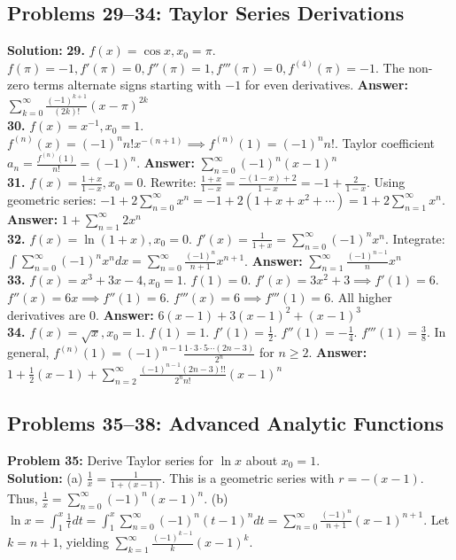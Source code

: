 \documentclass[11pt, letterpaper]{article}
\theoremstyle{definition}
\theoremstyle{remark}
\begin{document}
\subsection{Problems 29--34: Taylor Series Derivations}
\textbf{Solution:}
\textbf{29.} $f(x) = \cos x, x_0 = \pi$.
$f(\pi) = -1, f'(\pi) = 0, f''(\pi) = 1, f'''(\pi) = 0, f^{(4)}(\pi) = -1$.
The non-zero terms alternate signs starting with $-1$ for even derivatives.
\textbf{Answer:} $\sum_{k=0}^{\infty} \frac{(-1)^{k+1}}{(2k)!} (x-\pi)^{2k}$
\\[4pt]
\textbf{30.} $f(x) = x^{-1}, x_0 = 1$.
$f^{(n)}(x) = (-1)^n n! x^{-(n+1)} \implies f^{(n)}(1) = (-1)^n n!$.
Taylor coefficient $a_n = \frac{f^{(n)}(1)}{n!} = (-1)^n$.
\textbf{Answer:} $\sum_{n=0}^{\infty} (-1)^n (x-1)^n$
\\[4pt]
\textbf{31.} $f(x) = \frac{1+x}{1-x}, x_0 = 0$.
Rewrite: $\frac{1+x}{1-x} = \frac{-(1-x) + 2}{1-x} = -1 + \frac{2}{1-x}$.
Using geometric series: $-1 + 2 \sum_{n=0}^{\infty} x^n = -1 + 2(1 + x + x^2 + \cdots) = 1 + 2 \sum_{n=1}^{\infty} x^n$.
\textbf{Answer:} $1 + \sum_{n=1}^{\infty} 2 x^n$
\\[4pt]
\textbf{32.} $f(x) = \ln(1+x), x_0 = 0$.
$f'(x) = \frac{1}{1+x} = \sum_{n=0}^{\infty} (-1)^n x^n$.
Integrate: $\int \sum_{n=0}^{\infty} (-1)^n x^n dx = \sum_{n=0}^{\infty} \frac{(-1)^n}{n+1} x^{n+1}$.
\textbf{Answer:} $\sum_{n=1}^{\infty} \frac{(-1)^{n-1}}{n} x^n$
\\[4pt]
\textbf{33.} $f(x) = x^3 + 3x - 4, x_0 = 1$.
$f(1) = 0$. $f'(x) = 3x^2 + 3 \implies f'(1) = 6$. $f''(x) = 6x \implies f''(1) = 6$. $f'''(x) = 6 \implies f'''(1) = 6$. All higher derivatives are 0.
\textbf{Answer:} $6(x-1) + 3(x-1)^2 + (x-1)^3$
\\[4pt]
\textbf{34.} $f(x) = \sqrt{x}, x_0 = 1$.
$f(1) = 1$. $f'(1) = \frac{1}{2}$. $f''(1) = -\frac{1}{4}$. $f'''(1) = \frac{3}{8}$.
In general, $f^{(n)}(1) = (-1)^{n-1} \frac{1 \cdot 3 \cdot 5 \cdots (2n-3)}{2^n}$ for $n \ge 2$.
\textbf{Answer:} $1 + \frac{1}{2}(x-1) + \sum_{n=2}^{\infty} \frac{(-1)^{n-1} (2n-3)!!}{2^n n!} (x-1)^n$

\subsection{Problems 35--38: Advanced Analytic Functions}
\textbf{Problem 35:} Derive Taylor series for $\ln x$ about $x_0 = 1$.
\\[6pt]
\textbf{Solution:}
(a) $\frac{1}{x} = \frac{1}{1 + (x-1)}$. This is a geometric series with $r = -(x-1)$. Thus, $\frac{1}{x} = \sum_{n=0}^{\infty} (-1)^n (x-1)^n$.
(b) $\ln x = \int_1^x \frac{1}{t} dt = \int_1^x \sum_{n=0}^{\infty} (-1)^n (t-1)^n dt = \sum_{n=0}^{\infty} \frac{(-1)^n}{n+1} (x-1)^{n+1}$. Let $k = n+1$, yielding $\sum_{k=1}^{\infty} \frac{(-1)^{k-1}}{k} (x-1)^k$.
\end{document}
